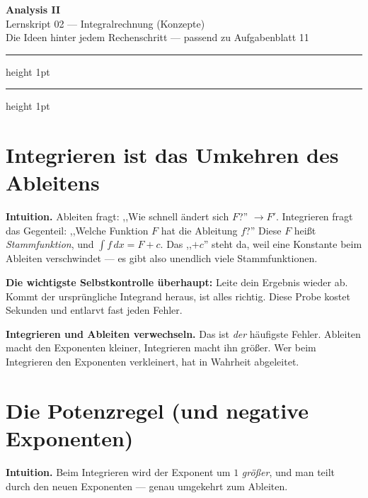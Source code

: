 \documentclass[a4paper,11pt]{article}
\begin{document}
\begin{center}
  {\color{accent}\Huge\bfseries Analysis II}\\[0.3em]
  {\Large Lernskript 02 — Integralrechnung (Konzepte)}\\[0.4em]
  {\color{gridcol}\small Die Ideen hinter jedem Rechenschritt — passend zu Aufgabenblatt 11}
\end{center}
\vspace{0.4em}
{\color{gridcol}\hrule height 1pt}
\vspace{0.6em}
{\color{fgtext}\tableofcontents}
\vspace{0.4em}
{\color{gridcol}\hrule height 1pt}

\section{Integrieren ist das Umkehren des Ableitens}

\textbf{Intuition.} Ableiten fragt: ,,Wie schnell ändert sich $F$?'' $\to F'$.
Integrieren fragt das Gegenteil: ,,Welche Funktion $F$ hat die Ableitung $f$?'' Diese $F$
heißt \emph{Stammfunktion}, und $\int f\,dx=F+c$. Das ,,$+c$'' steht da, weil eine Konstante
beim Ableiten verschwindet — es gibt also unendlich viele Stammfunktionen.

\begin{merkbox}
\textbf{Die wichtigste Selbstkontrolle überhaupt:} Leite dein Ergebnis wieder ab. Kommt der
ursprüngliche Integrand heraus, ist alles richtig. Diese Probe kostet Sekunden und entlarvt
fast jeden Fehler.
\end{merkbox}

\begin{fehlerbox}
\textbf{Integrieren und Ableiten verwechseln.} Das ist \emph{der} häufigste Fehler. Ableiten
macht den Exponenten kleiner, Integrieren macht ihn größer. Wer beim Integrieren den Exponenten
verkleinert, hat in Wahrheit abgeleitet.
\end{fehlerbox}

\section{Die Potenzregel (und negative Exponenten)}

\textbf{Intuition.} Beim Integrieren wird der Exponent um $1$ \emph{größer}, und man teilt durch
den neuen Exponenten — genau umgekehrt zum Ableiten.
\end{document}
